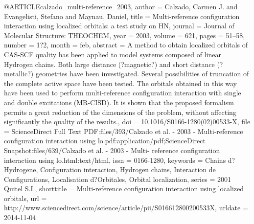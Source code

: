 @ARTICLE{calzado_multi-reference_2003,
  author = {Calzado, Carmen J. and Evangelisti, Stefano and Maynau, Daniel},
  title = {Multi-reference configuration interaction using localized orbitals:
	a test study on {HN}},
  journal = {Journal of Molecular Structure: THEOCHEM},
  year = {2003},
  volume = {621},
  pages = {51--58},
  number = {1?2},
  month = feb,
  abstract = {A method to obtain localized orbitals of CAS-SCF quality has been
	applied to model systems composed of linear Hydrogen chains. Both
	large distance (?magnetic?) and short distance (?metallic?) geometries
	have been investigated. Several possibilities of truncation of the
	complete active space have been tested. The orbitals obtained in
	this way have been used to perform multi-reference configuration
	interaction with single and double excitations (MR-CISD). It is shown
	that the proposed formalism permits a great reduction of the dimensions
	of the problem, without affecting significantly the quality of the
	results.},
  doi = {10.1016/S0166-1280(02)00533-X},
  file = {ScienceDirect Full Text PDF:files/393/Calzado et al. - 2003 - Multi-reference configuration      interaction using lo.pdf:application/pdf;ScienceDirect Snapshot:files/639/Calzado et al. - 2003 - Multi-  reference configuration interaction using lo.html:text/html},
  issn = {0166-1280},
  keywords = {Chains d?Hydrogene, Configuration interaction, Hydrogen chains, Interaction
	de Configurations, Localisation d?Orbitales, Orbital localization},
  series = {2001 {Quitel} {S}.{I}.},
  shorttitle = {Multi-reference configuration interaction using localized orbitals},
  url = {http://www.sciencedirect.com/science/article/pii/S016612800200533X},
  urldate = {2014-11-04}
}


